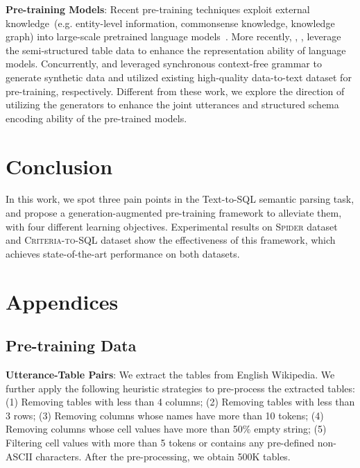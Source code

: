 \documentclass[letterpaper]{article} \usepackage{aaai21}  \usepackage{times}  \usepackage{helvet} \usepackage{courier}  \usepackage[hyphens]{url}  \usepackage{graphicx} \usepackage{booktabs}
\begin{document}
\smallskip \noindent \textbf{Pre-training Models}:
Recent pre-training techniques exploit external knowledge~(e.g. entity-level information, commonsense knowledge, knowledge graph) into large-scale pretrained language models~\cite{xiong2019pretrained,wang2020k,peters2019knowledge,rosset2020knowledge}. 
More recently, \citet{yin2020tabert}, \citet{herzig2020tapas}, leverage the semi-structured table data to enhance the representation ability of language models.
Concurrently, \citet{yu2020grappa} and \citet{deng2020structure} leveraged synchronous context-free grammar to generate synthetic data and utilized existing high-quality data-to-text dataset for pre-training, respectively.
Different from these work, we explore the direction of utilizing the generators to enhance the joint utterances and structured schema encoding ability of the pre-trained models.

\section{Conclusion}
In this work, we spot three pain points in the Text-to-SQL semantic parsing task, 
and propose a generation-augmented pre-training framework to alleviate them, with four different learning objectives.
Experimental results on \textsc{Spider} dataset and \textsc{Criteria-to-SQL} dataset show the effectiveness of this framework, which achieves state-of-the-art performance on both datasets.





\clearpage
\appendix

\section{Appendices}

\subsection{Pre-training Data}

\smallskip \noindent \textbf{Utterance-Table Pairs}:
We extract the tables from English Wikipedia.
We further apply the following heuristic strategies to pre-process the extracted tables:
(1) Removing tables with less than 4 columns;
(2) Removing tables with less than 3 rows;
(3) Removing columns whose names have more than 10 tokens;
(4) Removing columns whose cell values have more than 50\% empty string;
(5) Filtering cell values with more than 5 tokens or contains any pre-defined non-ASCII characters.
After the pre-processing, we obtain 500K tables.
\end{document}
